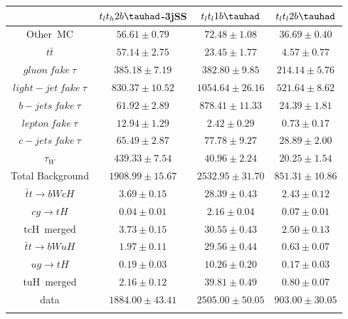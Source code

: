 \centering
\begin{tabular}{cccc} \toprule\toprule
 & $t_{l}t_{h}2b\tauhad$-3jSS & $t_{l}t_{l}1b\tauhad$ & $t_{l}t_{l}2b\tauhad$ \\\midrule
 Other~MC & $56.61\pm0.79$ & $72.48\pm1.08$ & $36.69\pm0.40$ \\
$t\bar{t}$ & $57.14\pm2.75$ & $23.45\pm1.77$ & $4.57\pm0.77$\\
$gluon~fake~\tau$ & $385.18\pm7.19$ & $382.80\pm9.85$ & $214.14\pm5.76$\\
$light-jet~fake~\tau$ & $830.37\pm10.52$ & $1054.64\pm26.16$ & $521.64\pm8.62$\\
$b-jets~fake~\tau$ & $61.92\pm2.89$ & $878.41\pm11.33$ & $24.39\pm1.81$\\
$lepton~fake~\tau$ & $12.94\pm1.29$ & $2.42\pm0.29$ & $0.73\pm0.17$\\
$c-jets~fake~\tau$ & $65.49\pm2.87$ & $77.78\pm9.27$ & $28.89\pm2.00$\\
$\tau_{W}$ & $439.33\pm7.54$ & $40.96\pm2.24$ & $20.25\pm1.54$\\\midrule
Total Background & $1908.99\pm15.67$ & $2532.95\pm31.70$ & $851.31\pm10.86$\\\midrule\midrule
$\bar{t}t\to bWcH$ & $3.69\pm0.15$ & $28.39\pm0.43$ & $2.43\pm0.12$\\
$cg\to tH$ & $0.04\pm0.01$ & $2.16\pm0.04$ & $0.07\pm0.01$\\
tcH~merged & $3.73\pm0.15$ & $30.55\pm0.43$ & $2.50\pm0.13$\\\midrule
$\bar{t}t\to bWuH$ & $1.97\pm0.11$ & $29.56\pm0.44$ & $0.63\pm0.07$\\
$ug\to tH$ & $0.19\pm0.03$ & $10.26\pm0.20$ & $0.17\pm0.03$\\
tuH~merged & $2.16\pm0.12$ & $39.81\pm0.49$ & $0.80\pm0.07$\\\midrule\midrule
data & $1884.00\pm43.41$ & $2505.00\pm50.05$ & $903.00\pm30.05$\\
\bottomrule\bottomrule\\
\end{tabular}
